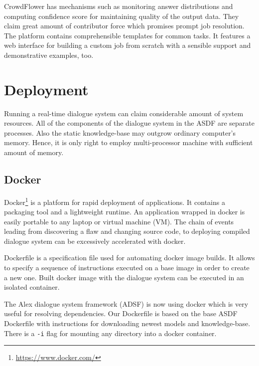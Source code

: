 CrowdFlower has mechanisms such as monitoring answer distributions and computing confidence score for maintaining quality of the output data. %
They claim great amount of contributor force which promises prompt job resolution. %
The platform contains comprehensible templates for common tasks.
It features a web interface for building a custom job from scratch with a sensible support and demonstrative examples, too. %


\section{Deployment}

Running a real-time dialogue system can claim considerable amount of system resources.
All of the components of the dialogue system in the ASDF are separate processes.
Also the static knowledge-base may outgrow ordinary computer's memory.
Hence, it is only right to employ multi-processor machine with sufficient amount of memory.

\subsection{Docker}

Docker\footnote{\url{https://www.docker.com/}} is a platform for rapid deployment of applications.
It contains a packaging tool and a lightweight runtime.
An application wrapped in docker is easily portable to any laptop or virtual machine (VM).
The chain of events leading from discovering a flaw and changing source code, to deploying compiled dialogue system can be excessively accelerated with docker.

Dockerfile is a specification file used for automating docker image builds.
It allows to specify a sequence of instructions executed on a base image in order to create a new one.
Built docker image with the dialogue system can be executed in an isolated container.

The Alex dialogue system framework (ADSF) is now using docker which is very useful for resolving dependencies.
Our Dockerfile is based on the base ASDF Dockerfile with instructions for downloading newest models and knowledge-base.
There is a \texttt{-i} flag for mounting any directory into a docker container.

